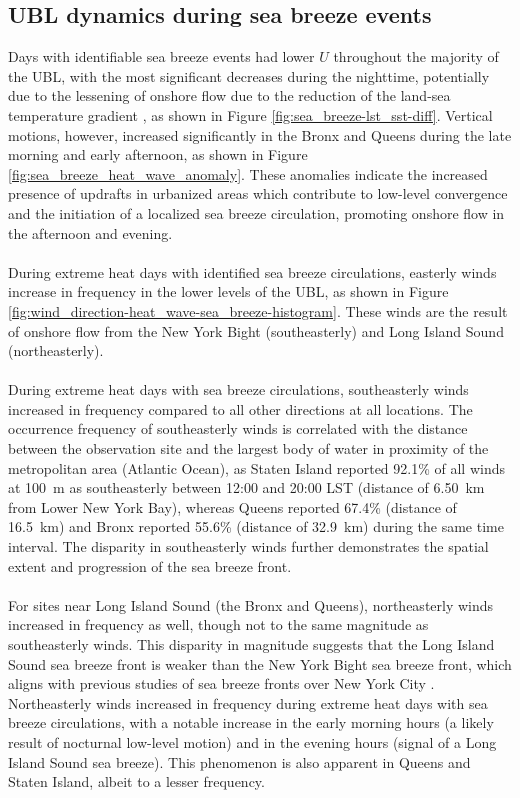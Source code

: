 \documentclass[11pt,a4paper]{article}
\begin{document}
\subsection{UBL dynamics during sea breeze events}
Days with identifiable sea breeze events had lower $U$ throughout the majority of the UBL, with the most significant decreases during the nighttime, potentially due to the lessening of onshore flow due to the reduction of the land-sea temperature gradient \citep{pullen2007}, as shown in Figure \ref{fig:sea_breeze-lst_sst-diff}. Vertical motions, however, increased significantly in the Bronx and Queens during the late morning and early afternoon, as shown in Figure \ref{fig:sea_breeze_heat_wave_anomaly}. These anomalies indicate the increased presence of updrafts in urbanized areas which contribute to low-level convergence and the initiation of a localized sea breeze circulation, promoting onshore flow in the afternoon and evening.
\\ \\
During extreme heat days with identified sea breeze circulations, easterly winds increase in frequency in the lower levels of the UBL, as shown in Figure \ref{fig:wind_direction-heat_wave-sea_breeze-histogram}. These winds are the result of onshore flow from the New York Bight (southeasterly) and Long Island Sound (northeasterly). 
\\ \\
During extreme heat days with sea breeze circulations, southeasterly winds increased in frequency compared to all other directions at all locations. The occurrence frequency of southeasterly winds is correlated with the distance between the observation site and the largest body of water in proximity of the metropolitan area (Atlantic Ocean), as Staten Island reported 92.1\% of all winds at \SI{100}{\meter} as southeasterly between 12:00 and 20:00 LST (distance of \SI{6.50}{\kilo\meter} from Lower New York Bay), whereas Queens reported 67.4\% (distance of \SI{16.5}{\kilo\meter}) and Bronx reported 55.6\% (distance of \SI{32.9}{\kilo\meter}) during the same time interval. The disparity in southeasterly winds further demonstrates the spatial extent and progression of the sea breeze front.
\\ \\
For sites near Long Island Sound (the Bronx and Queens), northeasterly winds increased in frequency as well, though not to the same magnitude as southeasterly winds. This disparity in magnitude suggests that the Long Island Sound sea breeze front is weaker than the New York Bight sea breeze front, which aligns with previous studies of sea breeze fronts over New York City \citep{frizzola1963, meir2013}. Northeasterly winds increased in frequency during extreme heat days with sea breeze circulations, with a notable increase in the early morning hours (a likely result of nocturnal low-level motion) and in the evening hours (signal of a Long Island Sound sea breeze). This phenomenon is also apparent in Queens and Staten Island, albeit to a lesser frequency. 
\end{document}
